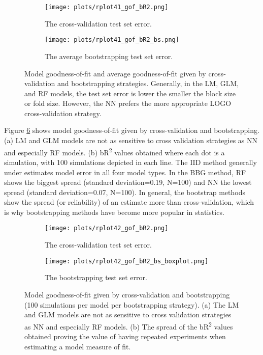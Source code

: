 \begin{figure}
	\centering
	\begin{subfigure}{\textwidth}
  		\centering
 		 \texttt{[image: plots/rplot41\_gof\_bR2.png]}
  		\caption{The cross-validation test set error.}
  		\label{fig:cvmoderror}
	\end{subfigure} 
	\begin{subfigure}{\textwidth}
  		\centering
  		\texttt{[image: plots/rplot41\_gof\_bR2\_bs.png]}
  		\caption{The average bootstrapping test set error.}
  		\label{fig:bsmoderror}
	\end{subfigure}
	\caption[Model goodness-of-fit and average goodness-of-fit given by cross-validation and bootstrapping strategies.]{Model goodness-of-fit and average goodness-of-fit given by cross-validation and bootstrapping strategies. Generally, in the LM, GLM, and RF models, the test set error is lower the smaller the block size or fold size. However, the NN prefers the more appropriate LOGO cross-validation strategy.}
	\label{fig:cvbserrors}
\end{figure}

Figure \ref{fig:cvbserrors2} shows model goodness-of-fit given by cross-validation and bootstrapping. (a) LM and GLM models are not as sensitive to cross validation strategies as NN and especially RF models. (b) bR\textsuperscript{2} values obtained where each dot is a simulation, with 100 simulations depicted in each line. The IID method generally under estimates model error in all four model types. In the BBG method, RF shows the biggest spread (standard deviation=0.19, N=100) and NN the lowest spread (standard deviation=0.07, N=100). In general, the bootstrap methods show the spread (or reliability) of an estimate more than cross-validation, which is why bootstrapping methods have become more popular in statistics. 

\begin{figure}
	\centering
	\begin{subfigure}{\textwidth}
  		\centering
 		 \texttt{[image: plots/rplot42\_gof\_bR2.png]}
  		\caption{The cross-validation test set error.}
  		\label{fig:cvmoderror2}
	\end{subfigure} 
	\begin{subfigure}{\textwidth}
  		\centering
  		\texttt{[image: plots/rplot42\_gof\_bR2\_bs\_boxplot.png]}
  		\caption{The bootstrapping test set error.}
  		\label{fig:bsmoderror2}
	\end{subfigure}
	\caption[Model goodness-of-fit given by cross-validation and bootstrapping.]{Model goodness-of-fit given by cross-validation and bootstrapping (100 simulations per model per bootstrapping strategy). (a) The LM and GLM models are not as sensitive to cross validation strategies as NN and especially RF models. (b) The spread of the bR\textsuperscript{2} values obtained proving the value of having repeated experiments when estimating a model measure of fit.}
	\label{fig:cvbserrors2}
\end{figure}

